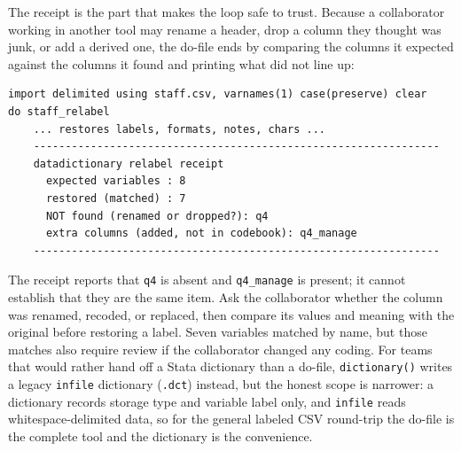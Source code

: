 The receipt is the part that makes the loop safe to trust. Because a collaborator working in another tool may rename a header, drop a column they thought was junk, or add a derived one, the do-file ends by comparing the columns it expected against the columns it found and printing what did not line up:
\par
{\footnotesize
\begin{verbatim}
import delimited using staff.csv, varnames(1) case(preserve) clear
do staff_relabel
    ... restores labels, formats, notes, chars ...
    ----------------------------------------------------------------
    datadictionary relabel receipt
      expected variables : 8
      restored (matched) : 7
      NOT found (renamed or dropped?): q4
      extra columns (added, not in codebook): q4_manage
    ----------------------------------------------------------------
\end{verbatim}
}
The receipt reports that \texttt{q4} is absent and \texttt{q4\_manage} is present; it cannot establish that they are the same item. Ask the collaborator whether the column was renamed, recoded, or replaced, then compare its values and meaning with the original before restoring a label. Seven variables matched by name, but those matches also require review if the collaborator changed any coding. For teams that would rather hand off a Stata dictionary than a do-file, \texttt{dictionary()} writes a legacy \texttt{infile} dictionary (\texttt{.dct}) instead, but the honest scope is narrower: a dictionary records storage type and variable label only, and \texttt{infile} reads whitespace-delimited data, so for the general labeled CSV round-trip the do-file is the complete tool and the dictionary is the convenience.

